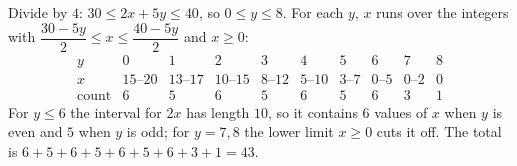 Divide by $4$: $30\le2x+5y\le40$, so $0\le y\le8$. For each $y$, $x$ runs over the integers with $\dfrac{30-5y}{2}\le x\le\dfrac{40-5y}{2}$ and $x\ge0$:
\[
\begin{array}{c|ccccccccc}
y&0&1&2&3&4&5&6&7&8\\ \hline
x&15\text{--}20&13\text{--}17&10\text{--}15&8\text{--}12&5\text{--}10&3\text{--}7&0\text{--}5&0\text{--}2&0\\
\text{count}&6&5&6&5&6&5&6&3&1
\end{array}
\]
For $y\le6$ the interval for $2x$ has length $10$, so it contains $6$ values of $x$ when $y$ is even and $5$ when $y$ is odd; for $y=7,8$ the lower limit $x\ge0$ cuts it off. The total is $6+5+6+5+6+5+6+3+1=\boxed{43}$.

